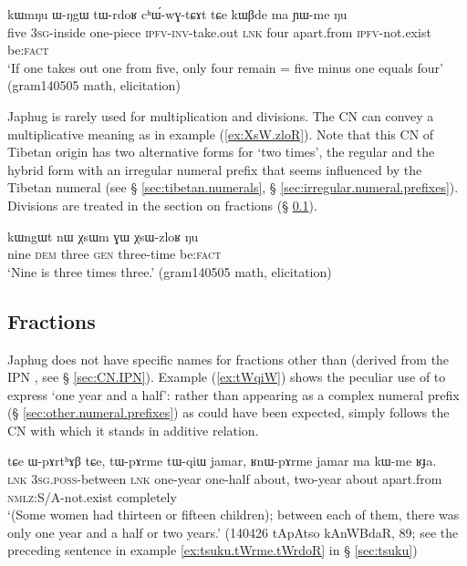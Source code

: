\begin{exe}
\ex \label{ex:tWrdoR.chWwGtCAt}
\gll kɯmŋu ɯ-ŋgɯ tɯ-rdoʁ cʰɯ́-wɣ-tɕɤt tɕe kɯβde ma ɲɯ-me ŋu \\
 five \textsc{3sg}-inside one-piece \textsc{ipfv}-\textsc{inv}-take.out \textsc{lnk} four apart.from \textsc{ipfv}-not.exist be:\textsc{fact} \\
\glt `If one takes out one from five, only four remain = five minus one equals four' (gram140505 math, elicitation)
\end{exe}

Japhug is rarely used for multiplication and divisions. The CN  can convey a multiplicative meaning  as in example (\ref{ex:XsW.zloR}). Note that this CN of Tibetan origin has two alternative forms for `two times', the regular   and the hybrid form  with an irregular numeral prefix that seems influenced by the Tibetan numeral  (see § \ref{sec:tibetan.numerals}, § \ref{sec:irregular.numeral.prefixes}). Divisions are treated in the section on fractions (§ \ref{sec:fractions}).

\begin{exe}
\ex \label{ex:XsW.zloR}
\gll  kɯngɯt nɯ χsɯm ɣɯ χsɯ-zloʁ ŋu \\
 nine \textsc{dem} three \textsc{gen} three-time be:\textsc{fact} \\
\glt `Nine is three times three.' (gram140505 math, elicitation)
\end{exe}
 
 
\subsection{Fractions} \label{sec:fractions}
Japhug does not have specific names for fractions other than  (derived from the IPN , see § \ref{sec:CN.IPN}). Example (\ref{ex:tWqiW}) shows the peculiar use of  to express `one year and a half': rather than appearing as a complex numeral prefix (§ \ref{sec:other.numeral.prefixes}) as could have been expected,    simply follows the CN  with which it stands in additive relation.

\begin{exe}
\ex \label{ex:tWqiW}
\gll tɕe ɯ-pɤrtʰɤβ tɕe, tɯ-pɤrme tɯ-qiɯ jamar, ʁnɯ-pɤrme jamar ma kɯ-me ʁɟa. \\
 \textsc{lnk} \textsc{3sg}.\textsc{poss}-between \textsc{lnk} one-year one-half about, two-year about apart.from \textsc{nmlz}:S/A-not.exist completely  \\
\glt  `(Some women had thirteen or fifteen children); between each of them, there was only one year and a half or two years.' (140426 tApAtso kAnWBdaR, 89; see the preceding sentence in example \ref{ex:tsuku.tWrme.tWrdoR} in § \ref{sec:tsuku})
\end{exe}



